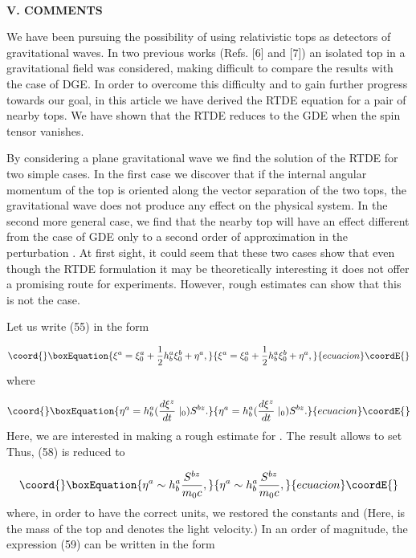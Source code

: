 \documentclass[a4paper,12pt]{article}
\begin{document}
\bigskip \smallskip\ 

\noindent \textbf{V. COMMENTS}

\bigskip

We have been pursuing the possibility of using relativistic tops as
detectors of gravitational waves. In two previous works (Refs. [6] and [7])
an isolated top in a gravitational field was considered, making difficult to
compare the results with the case of DGE. In order to overcome this
difficulty and to gain further progress towards our goal, in this article we
have derived the RTDE equation for a pair of nearby tops. We have shown that
the RTDE reduces to the GDE when the spin tensor vanishes.

By considering a plane gravitational wave we find the solution of the RTDE
for two simple cases. In the first case we discover that if the internal
angular momentum of the top is oriented along the vector separation of the
two tops, the gravitational wave does not produce any effect on the physical
system. In the second more general case, we find that the nearby top will
have an effect different from the case of GDE only to a second order of
approximation in the perturbation \coordHE{}. At first sight, it could seem
that these two cases show that even though the RTDE formulation it may be
theoretically interesting it does not offer a promising route for
experiments. However, rough estimates can show that this is not the case.

Let us write (55) in the form

\begin{equation}\coord{}\boxEquation{
\xi ^{a}=\xi _{0}^{a}+\frac{1}{2}h_{b}^{a}\xi _{0}^{b}+\eta ^{a},  \label{57}
}{
\xi ^{a}=\xi _{0}^{a}+\frac{1}{2}h_{b}^{a}\xi _{0}^{b}+\eta ^{a},  }{ecuacion}\coordE{}\end{equation}
where

\begin{equation}\coord{}\boxEquation{
\eta ^{a}=h_{b}^{a}(\frac{d\xi ^{z}}{dt}\mid _{0})S^{bz}.  \label{58}
}{
\eta ^{a}=h_{b}^{a}(\frac{d\xi ^{z}}{dt}\mid _{0})S^{bz}.  }{ecuacion}\coordE{}\end{equation}
Here, we are interested in making a rough estimate for \coordHE{}. The
result \coordHE{} allows to set \coordHE{} Thus, (58) is reduced to

\begin{equation}\coord{}\boxEquation{
\eta ^{a}\sim h_{b}^{a}\frac{S^{bz}}{m_{0}c},  \label{59}
}{
\eta ^{a}\sim h_{b}^{a}\frac{S^{bz}}{m_{0}c},  }{ecuacion}\coordE{}\end{equation}
where, in order to have the correct units, we restored the constants \coordHE{}
and \coordHE{} (Here, \coordHE{} is the mass of the top and \coordHE{} denotes the light
velocity.) In an order of magnitude, the expression (59) can be written in
the form
\end{document}
